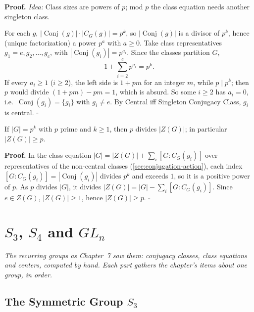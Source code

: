 \documentclass[11pt]{report}
\renewenvironment{proof}[1][Proof]{\noindent\textbf{#1.} }{\hfill$\square$\par\vspace{5pt}}
\begin{document}
\begin{proof}
\textit{Idea:} Class sizes are powers of $p$; mod $p$ the class equation needs another singleton class.\par
For each $g$, $|\operatorname{Conj}(g)| \cdot |C_G(g)| = p^k$, so $|\operatorname{Conj}(g)|$ is a divisor of $p^k$, hence (unique factorization) a power $p^{a}$ with $a \geq 0$. Take class representatives $g_1 = e, g_2, \ldots, g_c$, with $|\operatorname{Conj}(g_i)| = p^{a_i}$. Since the classes partition $G$,
\[ 1 + \sum_{i=2}^{c} p^{a_i} = p^k. \]
If every $a_i \geq 1$ ($i \geq 2$), the left side is $1 + pm$ for an integer $m$, while $p \mid p^k$; then $p$ would divide $(1 + pm) - pm = 1$, which is absurd. So some $i \geq 2$ has $a_i = 0$, i.e.\ $\operatorname{Conj}(g_i) = \{g_i\}$ with $g_i \neq e$. By Central iff Singleton Conjugacy Class, $g_i$ is central.
\end{proof}

\begin{corbox}[{$p$ Divides $|Z(G)|$}]\label{cor:p-divides-z-g}
If $|G| = p^k$ with $p$ prime and $k \geq 1$, then $p$ divides $|Z(G)|$; in particular $|Z(G)| \geq p$.
\end{corbox}

\begin{proof}
In the class equation $|G| = |Z(G)| + \sum_i [G : C_G(g_i)]$ over representatives of the non-central classes (\ref{sec:conjugation-action}), each index $[G : C_G(g_i)] = |\operatorname{Conj}(g_i)|$ divides $p^k$ and exceeds $1$, so it is a positive power of $p$. As $p$ divides $|G|$, it divides $|Z(G)| = |G| - \sum_i [G : C_G(g_i)]$. Since $e \in Z(G)$, $|Z(G)| \geq 1$, hence $|Z(G)| \geq p$.
\end{proof}


\section{\texorpdfstring{$S_3$, $S_4$ and $GL_n$}{S₃, S₄ and GLₙ}}\label{sec:rev-ch7}

\textit{The recurring groups as Chapter~7 saw them: conjugacy classes, class equations and centers, computed by hand. Each part gathers the chapter's items about one group, in order.}

\subsection{\texorpdfstring{The Symmetric Group $S_3$}{The Symmetric Group S₃}}\label{sec:rev-ch7-s3}
\end{document}
